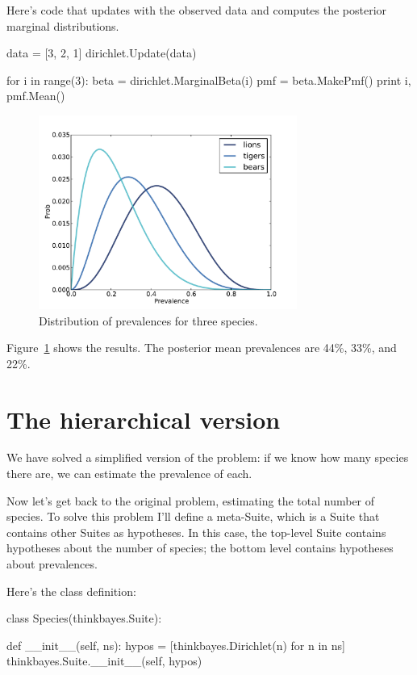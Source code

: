 \documentclass[12pt]{book}
\theoremstyle{exercise}
\begin{document}
Here's code that updates  with the observed data and
computes the posterior marginal distributions.

\begin{code}
    data = [3, 2, 1]
    dirichlet.Update(data)

    for i in range(3):
        beta = dirichlet.MarginalBeta(i)
        pmf = beta.MakePmf()
        print i, pmf.Mean()
\end{code}

\begin{figure}
\centerline{\includegraphics[height=2.5in]{figs/species1.pdf}}
\caption{Distribution of prevalences for three species.}
\label{fig.species1}
\end{figure}

Figure~\ref{fig.species1} shows the results.  The posterior
mean prevalences are 44\%, 33\%, and 22\%.


\section{The hierarchical version}

We have solved a simplified version of the problem: if we
know how many species there are, we can estimate the prevalence
of each.

Now let's get back to the original problem, estimating the total
number of species.  To solve this problem I'll define a meta-Suite,
which is a Suite that contains other Suites as hypotheses.  In this
case, the top-level Suite contains hypotheses about the number of
species; the bottom level contains hypotheses about prevalences.

Here's the class definition:

\begin{code}
class Species(thinkbayes.Suite):

    def __init__(self, ns):
        hypos = [thinkbayes.Dirichlet(n) for n in ns]
        thinkbayes.Suite.__init__(self, hypos)
\end{code}
\end{document}
